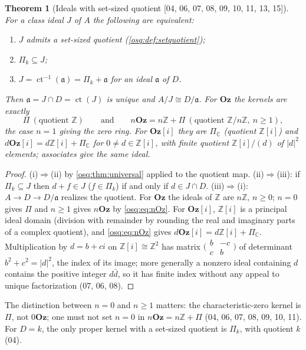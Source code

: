 \documentclass[11pt,letterpaper]{article}
\numberwithin{equation}{section}
\newtheorem{theorem}{Theorem}[section]
\theoremstyle{definition}
\theoremstyle{remark}
\theoremstyle{plain}
\newcommand{\Oz}{\mathbf{Oz}}
\newcommand{\GOz}{\Oz[i]}
\newcommand{\Z}{\mathbb Z}
\newcommand{\C}{\mathbb C}
\newcommand{\ct}{\operatorname{ct}}
\newcommand{\src}[1]{\textup{\textsf{[#1]}}}
\begin{document}
\begin{theorem}[Ideals with set-sized quotient \src{04, 06, 07, 08, 09, 10, 11, 13, 15}]\label{osq:thm:quotients}
For a class ideal $J$ of $A$ the following are equivalent:
\begin{enumerate}
\item $J$ admits a set-sized quotient (\cref{osq:def:setquotient});
\item $\Pi_k\subseteq J$;
\item $J=\ct^{-1}(\mathfrak a)=\Pi_k+\mathfrak a$ for an ideal $\mathfrak a$ of $D$.
\end{enumerate}
Then $\mathfrak a=J\cap D=\ct(J)$ is unique and $A/J\cong D/\mathfrak a$. For $\Oz$ the
kernels are exactly
\[
 \Pi\ (\text{quotient }\Z)\qquad\text{and}\qquad n\Oz=n\Z+\Pi\ (\text{quotient }\Z/n\Z,\ n\ge1),
\]
the case $n=1$ giving the zero ring. For $\GOz$ they are $\Pi_\C$ (quotient $\Z[i]$) and
$d\GOz=d\Z[i]+\Pi_\C$ for $0\ne d\in\Z[i]$, with finite quotient $\Z[i]/(d)$ of $|d|^2$
elements; associates give the same ideal.
\end{theorem}
\begin{proof}
(i)$\Rightarrow$(ii) by \cref{osq:thm:universal} applied to the quotient map.
(ii)$\Rightarrow$(iii): if $\Pi_k\subseteq J$ then $d+f\in J$ ($f\in\Pi_k$) if and only if
$d\in J\cap D$. (iii)$\Rightarrow$(i): $A\to D\to D/\mathfrak a$ realizes the quotient.
For $\Oz$ the ideals of $\Z$ are $n\Z$, $n\ge0$; $n=0$ gives $\Pi$ and $n\ge1$ gives
$n\Oz$ by \eqref{osq:eq:nOz}. For $\GOz$, $\Z[i]$ is a principal ideal domain (division
with remainder by rounding the real and imaginary parts of a complex quotient), and
\eqref{osq:eq:nOz} gives $d\GOz=d\Z[i]+\Pi_\C$. Multiplication by $d=b+ci$ on
$\Z[i]\cong\Z^2$ has matrix $\bigl(\begin{smallmatrix}b&-c\\c&b\end{smallmatrix}\bigr)$
of determinant $b^2+c^2=|d|^2$, the index of its image; more generally a nonzero ideal
containing $d$ contains the positive integer $d\bar d$, so it has finite index without any
appeal to unique factorization (07, 06, 08).
\end{proof}

The distinction between $n=0$ and $n\ge1$ matters: the characteristic-zero kernel is
$\Pi$, not $0\Oz$; one must not set $n=0$ in $n\Oz=n\Z+\Pi$ (04, 06, 07, 08, 09, 10, 11).
For $D=k$, the only proper kernel with a set-sized quotient is $\Pi_k$, with quotient $k$
(04).
\end{document}
